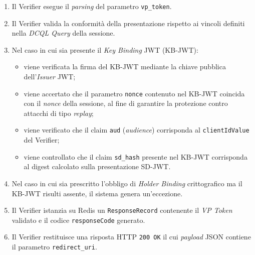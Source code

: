 \begin{enumerate}
    \item Il Verifier esegue il \textit{parsing} del parametro \texttt{vp\_\allowbreak{}token}.
    \item Il Verifier valida la conformità della presentazione rispetto ai vincoli definiti nella \textit{DCQL Query} della sessione.
    \item Nel caso in cui sia presente il \textit{Key Binding} JWT (KB-JWT\glsfirstoccur{}):
    \begin{itemize}
        \item viene verificata la firma del KB-JWT mediante la chiave pubblica dell'\textit{Issuer} JWT;
        \item viene accertato che il parametro \texttt{nonce} contenuto nel KB-JWT coincida con il \textit{nonce} della sessione, al fine di garantire la protezione contro attacchi di tipo \textit{replay};
        \item viene verificato che il claim \texttt{aud} (\textit{audience}) corrisponda al \texttt{clientIdValue} del Verifier;
        \item viene controllato che il claim \texttt{sd\_\allowbreak{}hash} presente nel KB-JWT corrisponda al digest calcolato sulla presentazione SD-JWT.
    \end{itemize}
    \item Nel caso in cui sia prescritto l'obbligo di \textit{Holder Binding} crittografico ma il KB-JWT risulti assente, il sistema genera un'eccezione.
    \item Il Verifier istanzia su Redis un \texttt{ResponseRecord} contenente il \textit{VP Token} validato e il codice \texttt{responseCode} generato.
    \item Il Verifier restituisce una risposta HTTP \texttt{200 OK} il cui \textit{payload} JSON contiene il parametro \texttt{redirect\_\allowbreak{}uri}.
\end{enumerate}

